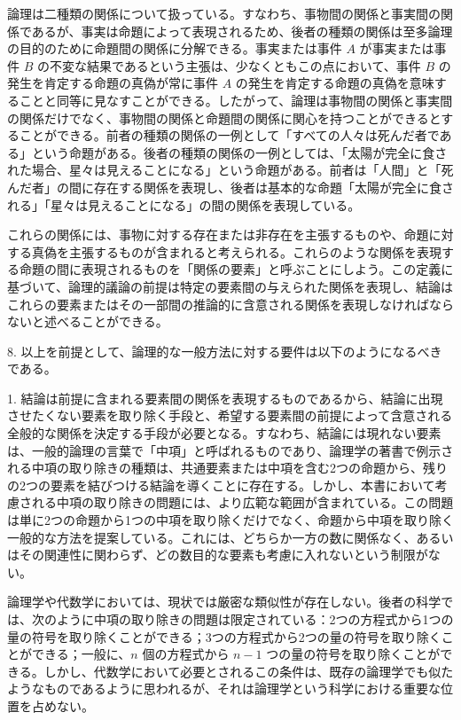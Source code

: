 \documentclass[a4paper,11pt,openany]{ltjsbook}
\begin{document}
論理は二種類の関係について扱っている。すなわち、事物間の関係と事実間の関係であるが、事実は命題によって表現されるため、後者の種類の関係は至多論理の目的のために命題間の関係に分解できる。事実または事件 $A$ が事実または事件 $B$ の不変な結果であるという主張は、少なくともこの点において、事件 $B$ の発生を肯定する命題の真偽が常に事件 $A$ の発生を肯定する命題の真偽を意味することと同等に見なすことができる。したがって、論理は事物間の関係と事実間の関係だけでなく、事物間の関係と命題間の関係に関心を持つことができるとすることができる。前者の種類の関係の一例として「すべての人々は死んだ者である」という命題がある。後者の種類の関係の一例としては、「太陽が完全に食された場合、星々は見えることになる」という命題がある。前者は「人間」と「死んだ者」の間に存在する関係を表現し、後者は基本的な命題「太陽が完全に食される」「星々は見えることになる」の間の関係を表現している。

これらの関係には、事物に対する存在または非存在を主張するものや、命題に対する真偽を主張するものが含まれると考えられる。これらのような関係を表現する命題の間に表現されるものを「関係の要素」と呼ぶことにしよう。この定義に基づいて、論理的議論の前提は特定の要素間の与えられた関係を表現し、結論はこれらの要素またはその一部間の推論的に含意される関係を表現しなければならないと述べることができる。

8. 以上を前提として、論理的な一般方法に対する要件は以下のようになるべきである。

1. 結論は前提に含まれる要素間の関係を表現するものであるから、結論に出現させたくない要素を取り除く手段と、希望する要素間の前提によって含意される全般的な関係を決定する手段が必要となる。すなわち、結論には現れない要素は、一般的論理の言葉で「中項」と呼ばれるものであり、論理学の著書で例示される中項の取り除きの種類は、共通要素または中項を含む2つの命題から、残りの2つの要素を結びつける結論を導くことに存在する。しかし、本書において考慮される中項の取り除きの問題には、より広範な範囲が含まれている。この問題は単に2つの命題から1つの中項を取り除くだけでなく、命題から中項を取り除く一般的な方法を提案している。これには、どちらか一方の数に関係なく、あるいはその関連性に関わらず、どの数目的な要素も考慮に入れないという制限がない。

論理学や代数学においては、現状では厳密な類似性が存在しない。後者の科学では、次のように中項の取り除きの問題は限定されている：2つの方程式から1つの量の符号を取り除くことができる；3つの方程式から2つの量の符号を取り除くことができる；一般に、$n$ 個の方程式から $n-1$ つの量の符号を取り除くことができる。しかし、代数学において必要とされるこの条件は、既存の論理学でも似たようなものであるように思われるが、それは論理学という科学における重要な位置を占めない。
\end{document}
